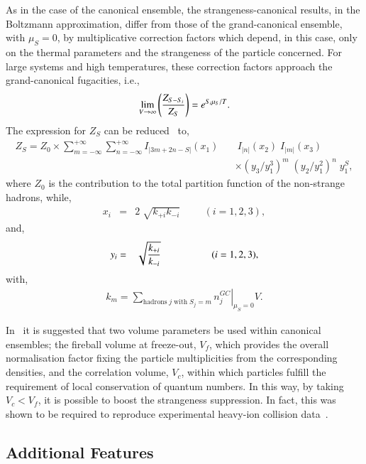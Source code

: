 \documentclass{elsarticle}
\begin{document}
As in the case of the canonical ensemble, the strangeness-canonical results, in the Boltzmann 
approximation, differ from those 
of the grand-canonical ensemble, with $\mu_S=0$, by multiplicative correction factors which 
depend, in this case, only on the thermal parameters and the strangeness of the particle concerned. For 
large systems and high temperatures, these correction 
factors approach the grand-canonical fugacities, i.e.,
\begin{equation}
\lim_{V\rightarrow \infty}\left({Z_{S-S_i}\over Z_{S}}\right)= e^{S_i\mu_S/T}.
\end{equation}
The expression for $Z_{S}$ can be reduced~\cite{BraunMunzinger:2001as} to,
\begin{eqnarray}
Z_{S} = Z_0\times\sum_{m=-\infty}^{+\infty}\sum_{n=-\infty}^{+\infty} I_{|3m+2n-S|}(x_1)&&\;I_{|n|}(x_2)\;I_{|m|}(x_3)\\\nonumber
&&\times(y_3/y_1^3)^m\;(y_2/y_1^2)^n\;y_1^{S},
\end{eqnarray}
where $Z_0$ is the contribution to the total partition function 
of the non-strange hadrons, while,
\begin{eqnarray}
x_i &=& 2\;\sqrt{k_{+i}k_{-i}}\hspace{1cm}(i=1,2,3),
\end{eqnarray}
and,
\begin{eqnarray}
y_i &=& \sqrt{{k_{+i}\over k_{-i}}}\hspace{1.8cm}(i=1,2,3),
\end{eqnarray}
with,
\begin{eqnarray}
k_{m} = \sum_{\mathrm{hadrons}\;j\;\mathrm{with}\;S_j=m}\left.n_j^{GC}\right|_{\mu_S=0}V.
\end{eqnarray}


In~\cite{Cleymans:2000ck,Redlich:2001bj,Cleymans:1998yb} it is suggested that two volume parameters be used 
within canonical ensembles; the fireball volume at freeze-out, $V_f$, which 
provides the overall normalisation factor fixing the particle multiplicities from 
the corresponding densities, and the correlation volume, $V_c$, within which 
particles fulfill the requirement of local conservation of quantum numbers. In 
this way, by taking $V_c<V_f$, it is possible to boost the strangeness 
suppression. In fact, this was shown to be required to reproduce experimental 
heavy-ion collision data~\cite{Cleymans:2000ck,Redlich:2001bj,Cleymans:1998yb}.\\ 

\subsection{Additional Features}
\end{document}
